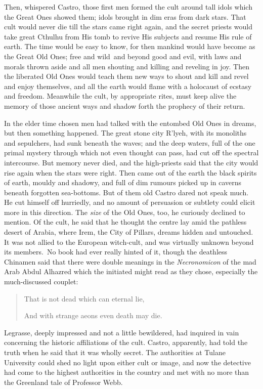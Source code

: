 Then, whispered Castro, those first men formed the cult around tall
idols which the Great Ones showed them; idols brought in dim eras from
dark stars. That cult would never die till the stars came right again,
and the secret priests would take great Cthulhu from His tomb to revive
His subjects and resume His rule of earth. The time would be easy to
know, for then mankind would have become as the Great Old Ones; free and
wild\est\ and beyond good and evil, with laws and morals thrown aside and all
men shouting and killing and reveling in joy. Then the liberated Old
Ones would teach them new ways to shout and kill and revel and enjoy
themselves, and all the earth would flame with a holocaust of ecstasy
and freedom. Meanwhile the cult, by appropriate rites, must keep alive
the memory of those ancient ways and shadow forth the prophecy of their
return.

In the elder time chosen men had talked with the entombed Old Ones in
dreams, but then something happened. The great stone city R'lyeh, with
its monoliths and sepulchers, had sunk beneath the waves; and the deep
waters, full of the one primal mystery through which not even thought
can pass, had cut off the spectral intercourse. But memory never died,
and the high-priests said that the city would rise again when the stars
were right. Then came out of the earth the black spirits of earth,
mouldy and shadowy, and full of dim rumours picked up in caverns beneath
forgotten sea-bottoms. But of them old Castro dared not speak much. He
cut himself off hurriedly, and no amount of persuasion or subtlety could
elicit more in this direction. The \emph{size} of the Old Ones, too, he
curiously declined to mention. Of the cult, he said that he thought the
centre lay amid the pathless desert of Arabia, where Irem, the City of
Pillars, dreams hidden and untouched. It was not allied to the European
witch-cult, and was virtually unknown beyond its members.\est\ No book had
ever really hinted of it, though the deathless Chinamen said that there
were double meanings in the \emph{Necronomicon} of the mad Arab Abdul Alhazred
which the initiated might read as they chose, especially the
much-discussed couplet:

\begin{quote}
\forceindent{}That is not dead which can eternal lie,

And with strange aeons even death may die.
\end{quote}

Legrasse, deeply impressed and not a little bewildered, had inquired in
vain concerning the historic affiliations of the cult. Castro,
apparently, had told the truth when he said that it was wholly secret.
The authorities at Tulane University could shed no light upon either
cult or image, and now the detective had come to the highest authorities
in the country and met with no more than the Greenland tale of Professor
Webb.

